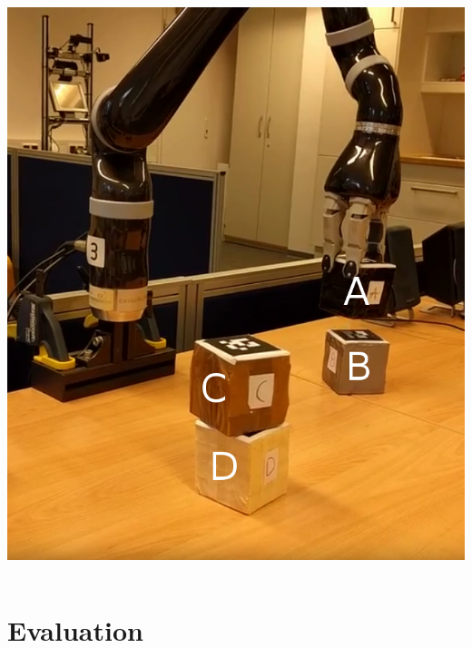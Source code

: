 \begin{frame}
\begin{columns}
\begin{column}{0.4\textwidth}
    \includegraphics[width=\textwidth]{../thesis/img/blocks-world-annotated}
    \end{column}
  \end{columns}
\end{frame}


\section{Evaluation}
\begin{frame}[plain]
  \tableofcontents[currentsection]
\end{frame}
\addtocounter{framenumber}{-1}

